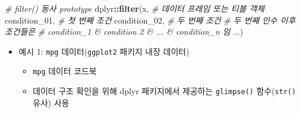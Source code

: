 \documentclass[
  11pt,
]{krantz}
\newenvironment{Shaded}{\begin{snugshade}}{\end{snugshade}}
\newcommand{\CommentTok}[1]{\textcolor[rgb]{0.37,0.37,0.37}{\textit{#1}}}
\newcommand{\DecValTok}[1]{\textcolor[rgb]{0.06,0.06,0.06}{#1}}
\newcommand{\KeywordTok}[1]{\textcolor[rgb]{0.27,0.27,0.27}{\textbf{#1}}}
\newcommand{\NormalTok}[1]{#1}
\newcommand{\OperatorTok}[1]{\textcolor[rgb]{0.43,0.43,0.43}{\textbf{#1}}}
\providecommand{\tightlist}{%
  \setlength{\itemsep}{0pt}\setlength{\parskip}{0pt}}
\begin{document}
\normalsize

\footnotesize

\begin{Shaded}
\begin{Highlighting}[]
\CommentTok{# filter() 동사 prototype}
\NormalTok{dplyr}\OperatorTok{::}\KeywordTok{filter}\NormalTok{(x, }\CommentTok{# 데이터 프레임 또는 티블 객체}
\NormalTok{              condition_}\DecValTok{01}\NormalTok{, }\CommentTok{# 첫 번째 조건}
\NormalTok{              condition_}\DecValTok{02}\NormalTok{, }\CommentTok{# 두 번째 조건}
                            \CommentTok{# 두 번째 인수 이후 조건들은 }
                            \CommentTok{# condition_1 & condition 2 & ... & condition_n 임}
\NormalTok{              ...)}
\end{Highlighting}
\end{Shaded}

\normalsize

\begin{itemize}
\item
  예시 1: \texttt{mpg} 데이터(\texttt{ggplot2} 패키지 내장 데이터)

  \begin{itemize}
  \tightlist
  \item
    \texttt{mpg} 데이터 코드북
  \item
    데이터 구조 확인을 위해 dplyr 패키지에서 제공하는 \texttt{glimpse()} 함수(\texttt{str()} 유사) 사용
  \end{itemize}
\end{itemize}

\footnotesize
\end{document}
